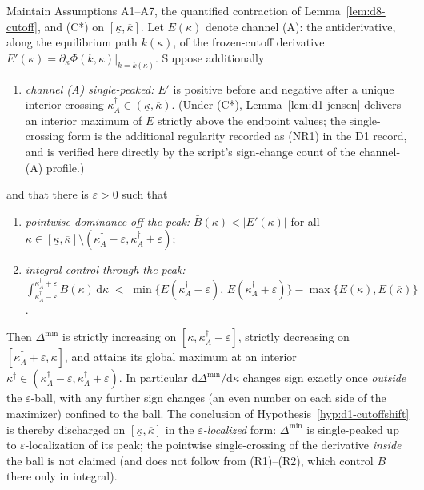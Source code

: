 \begin{theorem}
\label{thm:d8-region}
Maintain Assumptions \textup{A1--A7}, the quantified contraction of Lemma~\ref{lem:d8-cutoff}, and \textup{(C*)} on $[\underline\kappa,\overline\kappa]$. Let $E(\kappa)$ denote channel (A): the antiderivative, along the equilibrium path $k(\kappa)$, of the frozen-cutoff derivative $E'(\kappa)=\partial_\kappa\Phi(k,\kappa)\big|_{k=k(\kappa)}$. Suppose additionally
\begin{enumerate}
\item[\textup{(R0)}] \emph{channel (A) single-peaked:} $E'$ is positive before and negative after a unique interior crossing $\kappa_A^{\dagger}\in(\underline\kappa,\overline\kappa)$. (Under \textup{(C*)}, Lemma~\ref{lem:d1-jensen} delivers an interior maximum of $E$ strictly above the endpoint values; the single-crossing form is the additional regularity recorded as \textup{(NR1)} in the D1 record, and is verified here directly by the script's sign-change count of the channel-(A) profile.)
\end{enumerate}
and that there is $\varepsilon>0$ such that
\begin{enumerate}
\item[\textup{(R1)}] \emph{pointwise dominance off the peak:}\; $\bar B(\kappa)<|E'(\kappa)|$ for all $\kappa\in[\underline\kappa,\overline\kappa]\setminus(\kappa_A^{\dagger}-\varepsilon,\kappa_A^{\dagger}+\varepsilon)$;
\item[\textup{(R2)}] \emph{integral control through the peak:}\; $\int_{\kappa_A^{\dagger}-\varepsilon}^{\kappa_A^{\dagger}+\varepsilon}\bar B(\kappa)\,\mathrm{d}\kappa\;<\;\min\Big\{E(\kappa_A^{\dagger}-\varepsilon),\,E(\kappa_A^{\dagger}+\varepsilon)\Big\}-\max\Big\{E(\underline\kappa),E(\overline\kappa)\Big\}$.
\end{enumerate}
Then $\Delta^{\min}$ is strictly increasing on $[\underline\kappa,\kappa_A^{\dagger}-\varepsilon]$, strictly decreasing on $[\kappa_A^{\dagger}+\varepsilon,\overline\kappa]$, and attains its global maximum at an interior $\kappa^{\dagger}\in(\kappa_A^{\dagger}-\varepsilon,\kappa_A^{\dagger}+\varepsilon)$. In particular $\mathrm{d}\Delta^{\min}/\mathrm{d}\kappa$ changes sign exactly once \emph{outside} the $\varepsilon$-ball, with any further sign changes (an even number on each side of the maximizer) confined to the ball. The conclusion of Hypothesis~\ref{hyp:d1-cutoffshift} is thereby discharged on $[\underline\kappa,\overline\kappa]$ in the \emph{$\varepsilon$-localized} form: $\Delta^{\min}$ is single-peaked up to $\varepsilon$-localization of its peak; the pointwise single-crossing of the derivative \emph{inside} the ball is not claimed (and does not follow from \textup{(R1)}--\textup{(R2)}, which control $B$ there only in integral).
\end{theorem}

